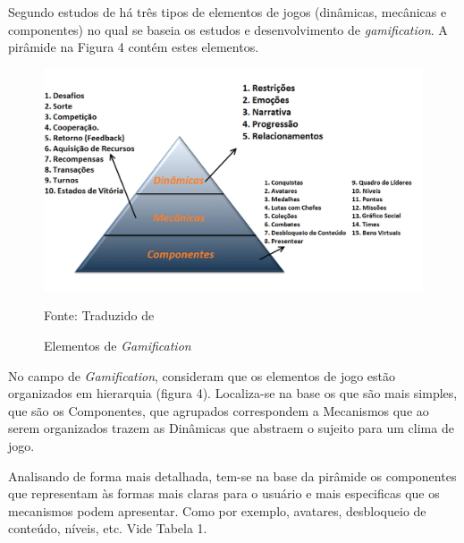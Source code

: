 \documentclass[
	12pt,				%
	openany,			%
	oneside,			%
	a4paper,			%
	english,			%
	french,				%
	spanish,			%
	brazil				%
	]{abntex2}
\begin{document}
Segundo estudos de  há três tipos de elementos de jogos (dinâmicas, mecânicas e componentes) no qual se baseia os estudos e desenvolvimento de \textit{gamification}. A pirâmide na Figura 4 contém estes elementos.

\begin{figure}[!htb]
    \centering
\caption{Elementos de \textit{Gamification}}
\includegraphics[width=15cm]{figuras/elementos.png}
\par
 Fonte: Traduzido de 
\end{figure}

No campo de \textit{Gamification},  consideram que os elementos de jogo estão organizados em hierarquia (figura 4). Localiza-se na base os que são mais simples, que são os Componentes, que agrupados correspondem a Mecanismos que ao serem organizados trazem as Dinâmicas que abstraem o sujeito para um clima de jogo.

	Analisando de forma mais detalhada, tem-se na base da pirâmide os componentes que representam às formas mais claras para o usuário e mais especificas que os mecanismos podem apresentar. Como por exemplo, avatares, desbloqueio de conteúdo, níveis, etc. Vide Tabela 1.
\end{document}
